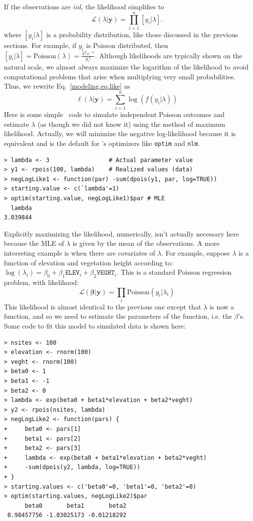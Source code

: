 If the observations are $iid$, the likelihood simplifies to
\begin{equation}
  \mathcal{L}(\lambda | \mathbf{y}) = \prod_{i=1}^n [y_i | \lambda].
  \label{modeling.eq.like}
\end{equation}
where $[y_i | \lambda]$ is a probability distribution, like those
discussed in the previous sections. For example, if $y_i$ is
Poisson distributed, then
$[y_i | \lambda] = \text{Poisson}(\lambda) = \frac{\lambda^{y_i}e^{-\lambda}}{y_i!}$.
Although likelihoods are typically shown on the natural scale, we
almost always maximize the logarithm of the likelihood to
avoid computational problems that arise when multiplying very small
probabilities. Thus, we rewrite Eq.~\ref{modeling.eq.like} as
\begin{equation}
  \ell(\lambda | \mathbf{y}) = \sum_{i=1}^n \log(f(y_i | \lambda))
  \label{modeling.eq.like2}
\end{equation}
Here is some simple \R~code to simulate independent Poisson outcomes
and estimate $\lambda$ (as though we did not know it) using the
method of maximum likelihood. Actually, we will minimize the negative
log-likelihood because it is equivalent and is the default for \R's
optimizers like \verb+optim+ and \verb+nlm+.
\begin{verbatim}
> lambda <- 3                 # Actual parameter value
> y1 <- rpois(100, lambda)    # Realized values (data)
> negLogLike1 <- function(par) -sum(dpois(y1, par, log=TRUE))
> starting.value <- c(`lambda'=1)
> optim(starting.value, negLogLike1)$par # MLE
  lambda
3.039844
\end{verbatim}
Explicitly maximizing the likelihood, numerically, isn't actually
necessary here because the MLE of
$\lambda$ is given by the  mean of the observations. A more interesting
example is when there are
covariates of $\lambda$. For example, suppose $\lambda$ is a function
of elevation and vegetation height according to: $\log(\lambda_i) =
\beta_0 + \beta_1\texttt{ELEV}_i + \beta_2\texttt{VEGHT}_i$. This is a
standard Poisson regression problem, with likelihood:
\begin{equation}
  \mathcal{L}(\bm{\beta} | \mathbf{y}) = \prod_i \text{Poisson}(y_i | \lambda_i)
  \label{modeling.eq.like3}
\end{equation}
This likelihood is almost identical to the previous one except
that $\lambda$ is now a function, and so we need to estimate the
parameters of the function, i.e. the $\beta$'s.
Some code to fit this model to simulated data is shown here:
\begin{verbatim}
> nsites <- 100
> elevation <- rnorm(100)
> veght <- rnorm(100)
> beta0 <- 1
> beta1 <- -1
> beta2 <- 0
> lambda <- exp(beta0 + beta1*elevation + beta2*veght)
> y2 <- rpois(nsites, lambda)
> negLogLike2 <- function(pars) {
+     beta0 <- pars[1]
+     beta1 <- pars[2]
+     beta2 <- pars[3]
+     lambda <- exp(beta0 + beta1*elevation + beta2*veght)
+     -sum(dpois(y2, lambda, log=TRUE))
+ }
> starting.values <- c('beta0'=0, 'beta1'=0, 'beta2'=0)
> optim(starting.values, negLogLike2)$par
      beta0       beta1       beta2
 0.98457756 -1.03025173 -0.01218292
\end{verbatim}
